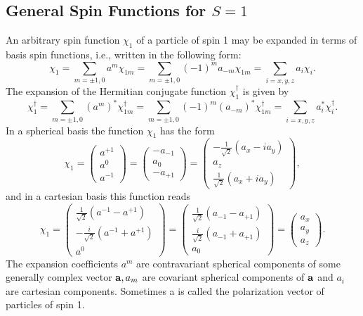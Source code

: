 \subsection{General Spin Functions for $S=1$}\label{sec:6.3.7}
An arbitrary spin function $\chi_{1}$ of a particle of spin 1 may be expanded in terms of basis spin functions, i.e., written in the following form:
\begin{equation}
\chi_{1}=\sum_{m= \pm 1,0} a^{m} \chi_{1 m}=\sum_{m= \pm 1,0}(-1)^{m} a_{-m} \chi_{1 m}=\sum_{i=x, y, z} a_{i} \chi_{i} . \label{eq:6:3:63}
\end{equation}
The expansion of the Hermitian conjugate function $\chi_{1}^{\dagger}$ is given by
\begin{equation}
\chi_{1}^{\dagger}=\sum_{m= \pm 1,0}\left(a^{m}\right)^{*} \chi_{1 m}^{\dagger}=\sum_{m= \pm 1,0}(-1)^{m}\left(a_{-m}\right)^{*} \chi_{1 m}^{\dagger}=\sum_{i=x, y, z} a_{i}^{*} \chi_{i}^{\dagger} . \label{eq:6:3:64}
\end{equation}
In a spherical basis the function $\chi_{1}$ has the form
\begin{equation}
\chi_{1}=\begin{pmatrix}
a^{+1} \\
a^{0} \\
a^{-1}
\end{pmatrix}=\begin{pmatrix}
-a_{-1} \\
a_{0} \\
-a_{+1}
\end{pmatrix}=\begin{pmatrix}
-\frac{1}{\sqrt{2}}\left(a_{x}-i a_{y}\right) \\
a_{z} \\
\frac{1}{\sqrt{2}}\left(a_{x}+i a_{y}\right)
\end{pmatrix}, \label{eq:6:3:65}
\end{equation}
and in a cartesian basis this function reads
\begin{equation}
\chi_{1}=\begin{pmatrix}
\frac{1}{\sqrt{2}}\left(a^{-1}-a^{+1}\right) \\
-\frac{i}{\sqrt{2}}\left(a^{-1}+a^{+1}\right) \\
a^{0}
\end{pmatrix}=\begin{pmatrix}
\frac{1}{\sqrt{2}}\left(a_{-1}-a_{+1}\right) \\
\frac{i}{\sqrt{2}}\left(a_{-1}+a_{+1}\right) \\
a_{0}
\end{pmatrix}=\begin{pmatrix}
a_{x} \\
a_{y} \\
a_{z}
\end{pmatrix} . \label{eq:6:3:66}
\end{equation}
The expansion coefficients $a^{m}$ are contravariant spherical components of some generally complex vector $\mathbf{a}, a_{m}$ are covariant spherical components of $\mathbf{a}$ and $a_{i}$ are cartesian components. Sometimes a is called the polarization vector of particles of spin 1.

